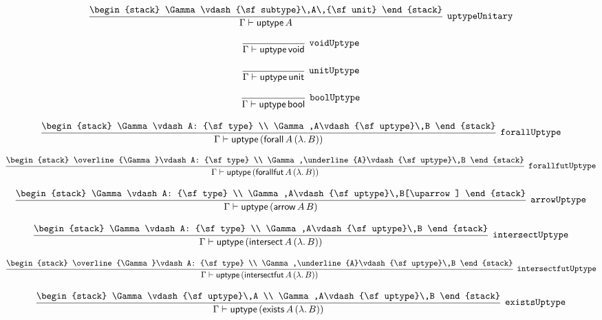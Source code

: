 \[
\infer[{\tt uptypeUnitary}]{\Gamma \vdash {\sf uptype}\,A}{
\begin{stack}
\Gamma \vdash {\sf subtype}\,A\,{\sf unit}
\end{stack}}
\]

\[
\infer[{\tt voidUptype}]{\Gamma \vdash {\sf uptype}\,{\sf void}}{}
\]

\[
\infer[{\tt unitUptype}]{\Gamma \vdash {\sf uptype}\,{\sf unit}}{}
\]

\[
\infer[{\tt boolUptype}]{\Gamma \vdash {\sf uptype}\,{\sf bool}}{}
\]

\[
\infer[{\tt forallUptype}]{\Gamma \vdash {\sf uptype}\,({\sf forall}\,A\,(\lambda .\,B))}{
\begin{stack}
\Gamma \vdash A: {\sf type}
\\
\Gamma ,A\vdash {\sf uptype}\,B
\end{stack}}
\]

\[
\infer[{\tt forallfutUptype}]{\Gamma \vdash {\sf uptype}\,({\sf forallfut}\,A\,(\lambda .\,B))}{
\begin{stack}
\overline{\Gamma}\vdash A: {\sf type}
\\
\Gamma ,\underline{A}\vdash {\sf uptype}\,B
\end{stack}}
\]

\[
\infer[{\tt arrowUptype}]{\Gamma \vdash {\sf uptype}\,({\sf arrow}\,A\,B)}{
\begin{stack}
\Gamma \vdash A: {\sf type}
\\
\Gamma ,A\vdash {\sf uptype}\,B[\uparrow ]
\end{stack}}
\]

\[
\infer[{\tt intersectUptype}]{\Gamma \vdash {\sf uptype}\,({\sf intersect}\,A\,(\lambda .\,B))}{
\begin{stack}
\Gamma \vdash A: {\sf type}
\\
\Gamma ,A\vdash {\sf uptype}\,B
\end{stack}}
\]

\[
\infer[{\tt intersectfutUptype}]{\Gamma \vdash {\sf uptype}\,({\sf intersectfut}\,A\,(\lambda .\,B))}{
\begin{stack}
\overline{\Gamma}\vdash A: {\sf type}
\\
\Gamma ,\underline{A}\vdash {\sf uptype}\,B
\end{stack}}
\]

\[
\infer[{\tt existsUptype}]{\Gamma \vdash {\sf uptype}\,({\sf exists}\,A\,(\lambda .\,B))}{
\begin{stack}
\Gamma \vdash {\sf uptype}\,A
\\
\Gamma ,A\vdash {\sf uptype}\,B
\end{stack}}
\]

